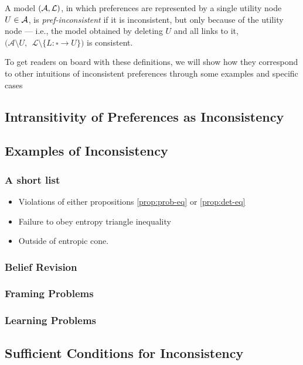 \documentclass{article}
\begin{document}
	\begin{defn}
		A model $(\cal A, L)$, in which preferences are represented by a single utility node $U \in \cal A$, is \textit{pref-inconsistent} if it is inconsistent, but only because of the utility node --- i.e., the model obtained by deleting $U$ and all links to it, $\big(\mathcal A \setminus U,~~\mathcal L \setminus \{ L : \square\to U \}\big)$ is consistent.
	\end{defn}

	To get readers on board with these definitions, we will show how they correspond to other intuitions of inconsistent preferences through some examples and specific cases
	
	\subsection{Intransitivity of Preferences as Inconsistency}
	



	
	\subsection{Examples of Inconsistency}\label{sec:inconsistency-ex}
	\subsubsection{A short list}
	\begin{itemize}[nosep]
		\item Violations of either propositions \ref{prop:prob-eq} or \ref{prop:det-eq}
		\item Failure to obey entropy triangle inequality
		\item Outside of entropic cone.
	\end{itemize}

	\subsubsection{Belief Revision}
	
	\subsubsection{Framing Problems}
	\subsubsection{Learning Problems}
	
	\subsection{Sufficient Conditions for Inconsistency}
	\begin{prop}
		
	\end{prop}
\end{document}
